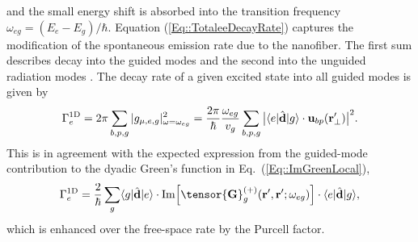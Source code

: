 \documentclass[preprint, aps,pra,onecolumn]{revtex4-1} %
\def\br{\mathbf{r}}
\def\bra#1{\langle{#1}\rvert}%
\def\ket#1{\lvert{#1}\rangle}%
\newcommand{\erf}[1]{Eq.~(\ref{#1})}
\newcommand{\oneD}{{\rm 1D}}
\begin{document}
and the small energy shift is absorbed into the transition frequency $\omega_{eg} = (E_e - E_g)/\hbar$.  
Equation (\ref{Eq::TotaleeDecayRate}) captures the modification of the spontaneous emission rate due to the nanofiber.  
The first sum describes decay into the guided modes and the second into the unguided radiation modes \cite{ nha_cavity_1997,klimov_spontaneous_2004,le_kien_spontaneous_2005,maslov_distribution_2006, scheel_directional_2015}. The decay rate of a given excited state into all guided modes is given by
	\begin{equation}
		\Gamma_e^{\oneD}= 2\pi \sum_{b,p,g} |g_{\mu,e,g} |^2_{\omega = \omega_{eg}} =  \frac{ 2\pi }{\hbar} \frac{ \omega_{eg} }{v_g} \sum_{b,p,g} \big|\bra{e}\hat{\mathbf{d}}\ket{g} \cdot \mathbf{u}_{bp}(\br'_\perp)\big|^2  .
	\end{equation}
This is in agreement with the expected expression from the guided-mode contribution to the dyadic Green's function in \erf{Eq::ImGreenLocal},
	\begin{equation} \label{Eq::Gamma1DGreens}
		\Gamma_e^{\oneD} =  \frac{2}{\hbar} \sum_{g}  \bra{g}\hat{\mathbf{d}}\ket{e}\cdot 
{\rm Im} \Big[\tensor{\mathbf{G}}^{(+)}_g(\br', \br'; \omega_{eg} ) \Big] \cdot \bra{e}\hat{\mathbf{d}}\ket{g},
	\end{equation}
which is enhanced over the free-space rate by the Purcell factor. 
\end{document}
